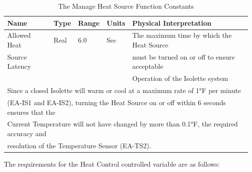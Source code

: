 \begin{table}
\begin{tabular}{|l|l|l|l|l|}
\hline
Name & Type & Range & Units & Physical Interpretation \\\hline
Allowed Heat & Real & 6.0 & Sec & The maximum time by which the Heat Source \\
Source Latency &  &  &  & must be turned on or off to ensure acceptable  \\
  &  &  &  & Operation of the Isolette system \\\hline
\multicolumn{5}{|l|}{Since a closed Isolette will warm or cool at a maximum rate of 1°F per minute} \\
\multicolumn{5}{|l|}{(EA-IS1 and EA-IS2), turning the Heat Source on or off within 6 seconds ensures that the} \\
\multicolumn{5}{|l|}{Current Temperature will not have changed by more than 0.1°F, the required accuracy and} \\
\multicolumn{5}{|l|}{resolution of the Temperature Sensor (EA-TS2).} \\\hline
\end{tabular}
\caption{The Manage Heat Source Function Constants}
\label{tab:MHSF-constants}
\end{table}

The requirements for the Heat Control controlled variable are as follows:

